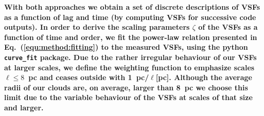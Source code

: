 \textbf{
    With both approaches we obtain a set of discrete descriptions of VSFs as a function of  lag  and time (by computing VSFs for successive code outputs).
 In order to derive the scaling parameters $\zeta$ of the VSFs as a function of time and order, we 
fit the power-law relation presented in Eq.~(\ref{equ:method:fitting}) to the measured VSFs,     
     using the python \texttt{curve\_fit} package.
Due to the rather irregular behaviour of our VSFs at larger scales, we define
 the weighting function 
     to emphasize scales $\ell \leq 8$~pc and 
ceases outside with 1~pc/$\ell$[pc]. 
    Although the average radii of our clouds are, on average, larger than 8~pc we choose this limit due to the variable behaviour of the VSFs at 
    scales of that size and larger.
}

